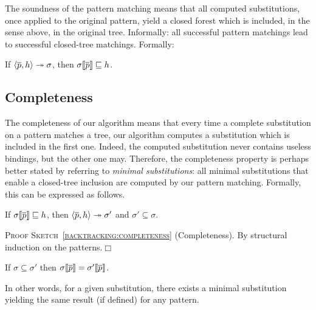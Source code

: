 The soundness of the pattern matching means that all computed
substitutions, once applied to the original pattern, yield a closed
forest which is included, in the sense above, in the original
tree. Informally: all successful pattern matchings lead to successful
closed\hyp{}tree matchings. Formally:
\begin{thm}[Soundness]\hfill
\label{backtracking:soundness}
\begin{center}
If \(\smat{h}{\overline{p}} \twoheadrightarrow \sigma\),
then \(\subst{\overline{p}}{\sigma} \sqsubseteq h\).
\end{center}
\end{thm}



\subsection{Completeness}

The completeness of our algorithm means that every time a complete
substitution on a pattern matches a tree, our algorithm computes a
substitution which is included in the first one. Indeed, the computed
substitution never contains useless bindings, but the other one
may. Therefore, the completeness property is perhaps better stated by
referring to \emph{minimal substitutions}: all minimal substitutions
that enable a closed\hyp{}tree inclusion are computed by our pattern
matching. Formally, this can be expressed as follows.
\begin{thm}[Completeness]\hfill
\label{backtracking:completeness}
\begin{center}
If   \(\subst{\overline{p}}{\sigma} \sqsubseteq h\),
then \(\smat{h}{\overline{p}} \twoheadrightarrow \sigma'\) 
and  \(\sigma' \subseteq \sigma\).
\end{center}
\end{thm}

\noindent\textsc{Proof Sketch~\ref{backtracking:completeness}}
(Completeness). By structural induction on the patterns.\(\Box\)

\begin{lem}[Minimality]\hfill
\label{minimality}
\begin{center}
If \(\sigma \subseteq \sigma'\) 
then \(\subst{\overline{p}}{\sigma} = \subst{\overline{p}}{\sigma'}\).
\end{center}
\end{lem}
\noindent In other words, for a given substitution, there exists a
minimal substitution yielding the same result (if defined) for any
pattern.

